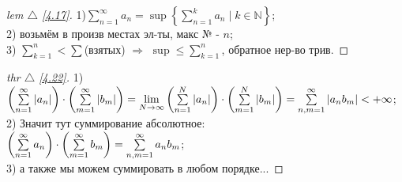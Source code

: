 
\begin{minipage}[]{0.45\textwidth}
\begin{proof}[
lem $\triangle$
\eqref{4.17}]

\phantom{42}
\noindent

1)$\sum\nolimits_{ n = 1 }^{ \infty } a_n = \sup\left\{\sum\nolimits_{ n = 1 }^{ k } a_n \mid k \in \mathbb{N} \right\}$;\\
2) возьмём в произв местах эл-ты, макс № - $n$;\\
3) $\sum\nolimits_{ k = 1 }^{ n } <\sum$(взятых) $\Rightarrow$ $\sup \leq \sum\nolimits_{ k= 1 }^{ n } $, обратное нер-во трив.
\end{proof}

\begin{proof}[
thr $\triangle$
\eqref{4.22}]

\phantom{42}
\noindent

1) $\left( \sum\limits_{ n=1 }^{ \infty } |a_n| \right) \cdot \left( \sum\limits_{ m=1 }^{ \infty } |b_m| \right) = \lim\limits_{N \to \infty} \left(\sum\limits_{ n=1 }^{ N } |a_n|\right) \cdot \left(\sum\limits_{ m=1 }^{ N } |b_m|\right) = \sum\limits_{ n,m =1 }^{ \infty } |a_n b_m| < +\infty$;\\
2) Значит тут суммирование абсолютное:\\
$\left(\sum\limits_{ n=1 }^{ \infty } a_n\right) \cdot \left(\sum\limits_{ m=1 }^{ \infty } b_m\right) = \sum\limits_{ n,m=1 }^{ \infty } a_n b_m$;\\
3) а также мы можем суммировать в любом порядке...
\end{proof}
\end{minipage}
\hfill
